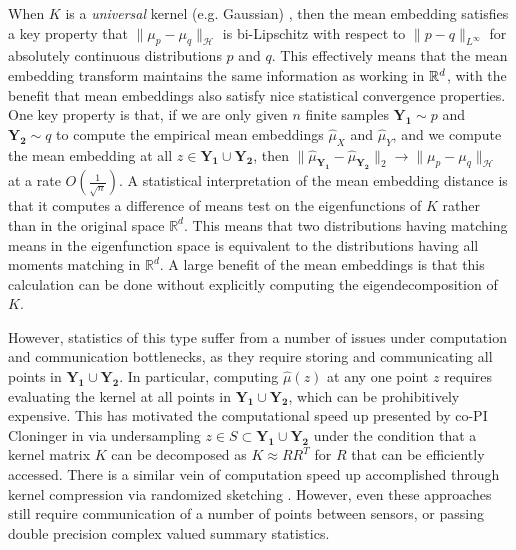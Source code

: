 

When $K$ is a \emph{universal} kernel (e.g. Gaussian) \cite{micchelli2006universal}, then the mean embedding satisfies a key property that $\|\mu_p - \mu_q\|_\mathcal{H}$ %
is bi-Lipschitz with respect to $\|p - q\|_{L^{\infty}}$ for absolutely continuous distributions $p$ and $q$.  This effectively means that the mean embedding transform maintains the same information as working in $\mathbb{R}^d$, with the benefit that mean embeddings also satisfy nice statistical convergence properties.  One key property is that, if we are only given $n$ finite samples $\mathbf{Y_1}\sim p$ and $\mathbf{Y_2}\sim q$ to compute the empirical mean embeddings $\widehat{\mu}_X$ and $\widehat{\mu}_Y$, and we compute the mean embedding at all $z\in \mathbf{Y_1}\cup \mathbf{Y_2}$, then $\|\widehat{\mu}_\mathbf{Y_1} - \widehat{\mu}_\mathbf{Y_2}\|_2 \rightarrow \|\mu_p - \mu_q\|_\mathcal{H}$ at a rate $O\left(\frac{1}{\sqrt{n}}\right)$.  A statistical interpretation of the mean embedding distance is that it computes a difference of means test on the eigenfunctions of $K$ rather than in the original space $\mathbb{R}^d$.  This means that two distributions having matching means in the eigenfunction space is equivalent to the distributions having all moments matching in $\mathbb{R}^d$.  A large benefit of the mean embeddings is that this calculation can be done without explicitly computing the eigendecomposition of $K$.


However, statistics of this type suffer from a number of issues under computation and communication bottlenecks, as they require storing and communicating all points in $\mathbf{Y_1}\cup \mathbf{Y_2}$.  In particular, computing $\hat{\mu}(z)$ at any one point $z$ requires evaluating the kernel at all points in $\mathbf{Y_1}\cup \mathbf{Y_2}$, which can be prohibitively expensive.
This has motivated the computational speed up presented by co-PI Cloninger in \cite{cheng2017two} via undersampling $z\in S\subset \mathbf{Y_1}\cup \mathbf{Y_2}$ under the condition that a kernel matrix $K$ can be decomposed as $K\approx RR^T$ for $R$ that can be efficiently accessed.  There is a similar vein of computation speed up accomplished through kernel compression via randomized sketching \cite{gribonval2017compressive}.  However, even these approaches still require communication of a number of points between sensors, or passing double precision complex valued summary statistics.  







